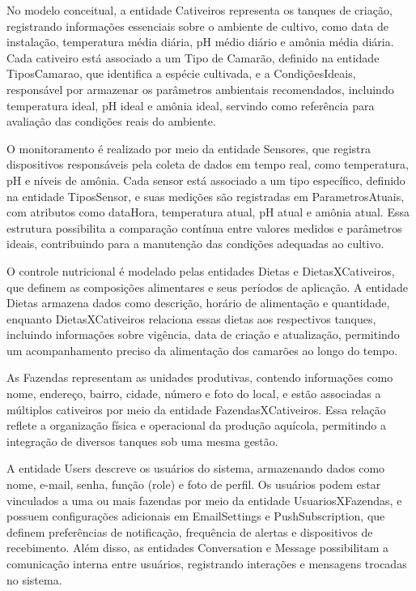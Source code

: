 \documentclass[
  a4paper,
  12pt,
  english,
  brazilian,
]{article}
\begin{document}
No modelo conceitual, a entidade Cativeiros representa os tanques de criação, registrando informações essenciais sobre o ambiente de cultivo, como data de instalação, temperatura média diária, pH médio diário e amônia média diária. Cada cativeiro está associado a um Tipo de Camarão, definido na entidade TiposCamarao, que identifica a espécie cultivada, e a CondiçõesIdeais, responsável por armazenar os parâmetros ambientais recomendados, incluindo temperatura ideal, pH ideal e amônia ideal, servindo como referência para avaliação das condições reais do ambiente.

O monitoramento é realizado por meio da entidade Sensores, que registra dispositivos responsáveis pela coleta de dados em tempo real, como temperatura, pH e níveis de amônia. Cada sensor está associado a um tipo específico, definido na entidade TiposSensor, e suas medições são registradas em ParametrosAtuais, com atributos como dataHora, temperatura atual, pH atual e amônia atual. Essa estrutura possibilita a comparação contínua entre valores medidos e parâmetros ideais, contribuindo para a manutenção das condições adequadas ao cultivo.

O controle nutricional é modelado pelas entidades Dietas e DietasXCativeiros, que definem as composições alimentares e seus períodos de aplicação. A entidade Dietas armazena dados como descrição, horário de alimentação e quantidade, enquanto DietasXCativeiros relaciona essas dietas aos respectivos tanques, incluindo informações sobre vigência, data de criação e atualização, permitindo um acompanhamento preciso da alimentação dos camarões ao longo do tempo.

As Fazendas representam as unidades produtivas, contendo informações como nome, endereço, bairro, cidade, número e foto do local, e estão associadas a múltiplos cativeiros por meio da entidade FazendasXCativeiros. Essa relação reflete a organização física e operacional da produção aquícola, permitindo a integração de diversos tanques sob uma mesma gestão.

A entidade Users descreve os usuários do sistema, armazenando dados como nome, e-mail, senha, função (role) e foto de perfil. Os usuários podem estar vinculados a uma ou mais fazendas por meio da entidade UsuariosXFazendas, e possuem configurações adicionais em EmailSettings e PushSubscription, que definem preferências de notificação, frequência de alertas e dispositivos de recebimento. Além disso, as entidades Conversation e Message possibilitam a comunicação interna entre usuários, registrando interações e mensagens trocadas no sistema.
\end{document}
